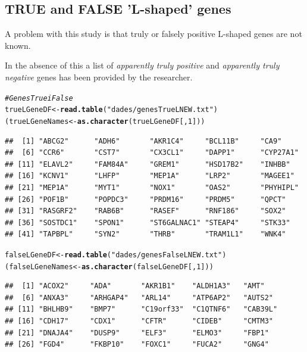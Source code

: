 \documentclass[a4paper,10pt]{article}\usepackage[]{graphicx}\usepackage[]{color}
\makeatletter
\newcommand{\hlnum}[1]{\textcolor[rgb]{0.686,0.059,0.569}{#1}}%
\newcommand{\hlstr}[1]{\textcolor[rgb]{0.192,0.494,0.8}{#1}}%
\newcommand{\hlcom}[1]{\textcolor[rgb]{0.678,0.584,0.686}{\textit{#1}}}%
\newcommand{\hlstd}[1]{\textcolor[rgb]{0.345,0.345,0.345}{#1}}%
\newcommand{\hlkwb}[1]{\textcolor[rgb]{0.69,0.353,0.396}{#1}}%
\newcommand{\hlkwd}[1]{\textcolor[rgb]{0.737,0.353,0.396}{\textbf{#1}}}%
\newenvironment{kframe}{%
 \def\at@end@of@kframe{}%
 \ifinner\ifhmode%
  \def\at@end@of@kframe{\end{minipage}}%
  \begin{minipage}{\columnwidth}%
 \fi\fi%
 \def\FrameCommand##1{\hskip\@totalleftmargin \hskip-\fboxsep
 \colorbox{shadecolor}{##1}\hskip-\fboxsep
     \hskip-\linewidth \hskip-\@totalleftmargin \hskip\columnwidth}%
 \MakeFramed {\advance\hsize-\width
   \@totalleftmargin\z@ \linewidth\hsize
   \@setminipage}}%
 {\par\unskip\endMakeFramed%
 \at@end@of@kframe}
\newenvironment{knitrout}{}{} %
\makeatother
\begin{document}
\subsection{TRUE and FALSE 'L-shaped' genes}

A problem with this study is that truly or falsely positive L-shaped genes are not known.

In the absence of this a list of \emph{apparently truly positive} and \emph{apparently truly negative} genes has been provided by the researcher.

\begin{knitrout}
\color{fgcolor}\begin{kframe}
\begin{alltt}
\hlcom{# Genes True i False}
\hlstd{trueLGeneDF} \hlkwb{<-}\hlkwd{read.table}\hlstd{(}\hlstr{"dades/genesTrueLNEW.txt"}\hlstd{)}
\hlstd{(trueLGeneNames} \hlkwb{<-} \hlkwd{as.character}\hlstd{(trueLGeneDF[,}\hlnum{1}\hlstd{]))}
\end{alltt}
\begin{verbatim}
##  [1] "ABCG2"      "ADH6"       "AKR1C4"     "BCL11B"     "CA9"       
##  [6] "CCR6"       "CST7"       "CX3CL1"     "DAPP1"      "CYP27A1"   
## [11] "ELAVL2"     "FAM84A"     "GREM1"      "HSD17B2"    "INHBB"     
## [16] "KCNV1"      "LHFP"       "MEP1A"      "LRP2"       "MAGEE1"    
## [21] "MEP1A"      "MYT1"       "NOX1"       "OAS2"       "PHYHIPL"   
## [26] "POF1B"      "POPDC3"     "PRDM16"     "PRDM5"      "QPCT"      
## [31] "RASGRF2"    "RAB6B"      "RASEF"      "RNF186"     "SOX2"      
## [36] "SOSTDC1"    "SPON1"      "ST6GALNAC1" "STEAP4"     "STK33"     
## [41] "TAPBPL"     "SYN2"       "THRB"       "TRAM1L1"    "WNK4"
\end{verbatim}
\begin{alltt}
\hlstd{falseLGeneDF} \hlkwb{<-} \hlkwd{read.table}\hlstd{(}\hlstr{"dades/genesFalseLNEW.txt"}\hlstd{)}
\hlstd{(falseLGeneNames} \hlkwb{<-} \hlkwd{as.character}\hlstd{(falseLGeneDF[,}\hlnum{1}\hlstd{]))}
\end{alltt}
\begin{verbatim}
##  [1] "ACOX2"     "ADA"       "AKR1B1"    "ALDH1A3"   "AMT"      
##  [6] "ANXA3"     "ARHGAP4"   "ARL14"     "ATP6AP2"   "AUTS2"    
## [11] "BHLHB9"    "BMP7"      "C19orf33"  "C1QTNF6"   "CAB39L"   
## [16] "CDH17"     "CDX1"      "CFTR"      "CIDEB"     "CMTM3"    
## [21] "DNAJA4"    "DUSP9"     "ELF3"      "ELMO3"     "FBP1"     
## [26] "FGD4"      "FKBP10"    "FOXC1"     "FUCA2"     "GNG4"     

\end{verbatim}
\end{kframe}
\end{knitrout}
\end{document}
